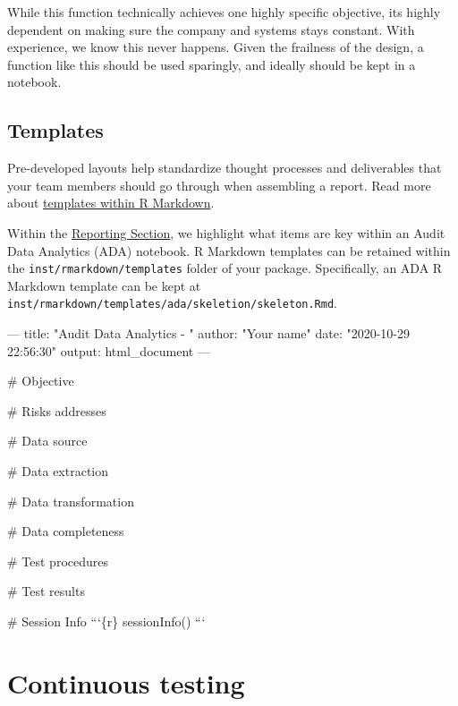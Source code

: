 \documentclass[
]{book}
\newenvironment{Shaded}{\begin{snugshade}}{\end{snugshade}}
\newcommand{\BaseNTok}[1]{\textcolor[rgb]{0.00,0.00,0.81}{#1}}
\newcommand{\FunctionTok}[1]{\textcolor[rgb]{0.00,0.00,0.00}{#1}}
\newcommand{\NormalTok}[1]{#1}
\begin{document}
While this function technically achieves one highly specific objective, its highly dependent on making sure the company and systems stays constant. With experience, we know this never happens. Given the frailness of the design, a function like this should be used sparingly, and ideally should be kept in a notebook.

\hypertarget{templates}{%
\section{Templates}\label{templates}}

Pre-developed layouts help standardize thought processes and deliverables that your team members should go through when assembling a report. Read more about \href{https://bookdown.org/yihui/rmarkdown-cookbook/package-template.html}{templates within R Markdown}.

Within the \protect\hyperlink{report-structure}{Reporting Section}, we highlight what items are key within an Audit Data Analytics (ADA) notebook. R Markdown templates can be retained within the \texttt{inst/rmarkdown/templates} folder of your package. Specifically, an ADA R Markdown template can be kept at \texttt{inst/rmarkdown/templates/ada/skeletion/skeleton.Rmd}.

\begin{Shaded}
\begin{Highlighting}[]
\NormalTok{---}
\NormalTok{title: "Audit Data Analytics - "}
\NormalTok{author: "Your name"}
\NormalTok{date: "2020-10-29 22:56:30"}
\NormalTok{output:}
\NormalTok{  html_document}
\NormalTok{---}

\FunctionTok{# Objective}

\FunctionTok{# Risks addresses}

\FunctionTok{# Data source}

\FunctionTok{# Data extraction}

\FunctionTok{# Data transformation}

\FunctionTok{# Data completeness}

\FunctionTok{# Test procedures}

\FunctionTok{# Test results}

\FunctionTok{# Session Info}
\BaseNTok{```\{r\}}
\BaseNTok{sessionInfo()}
\BaseNTok{```}
\end{Highlighting}
\end{Shaded}

\hypertarget{continuous-testing}{%
\chapter{Continuous testing}\label{continuous-testing}}
\end{document}
